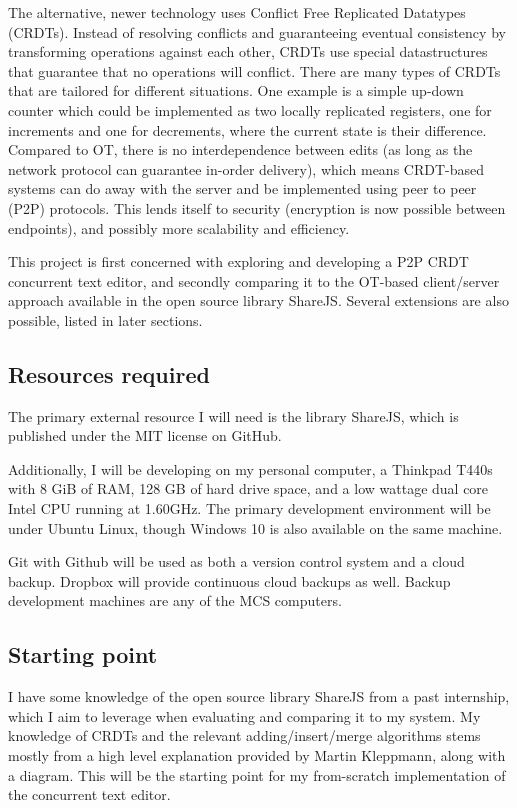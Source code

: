 \documentclass[12pt,a4paper,twoside]{article}
\begin{document}
The alternative, newer technology uses Conflict Free Replicated Datatypes (CRDTs). Instead of resolving conflicts and guaranteeing
eventual consistency by transforming operations against each other, CRDTs use special datastructures that guarantee
that no operations will conflict. There are many types of CRDTs that are tailored for different situations. One example
is a simple up-down counter which could be implemented as two locally replicated registers, one for increments and one
for decrements, where the current state is their difference. Compared to OT, there is no interdependence between edits (as long
as the network protocol can guarantee in-order delivery), which means CRDT-based systems can do away with the server
and be implemented using peer to peer (P2P) protocols. This lends itself to security (encryption is now possible between endpoints),
and possibly more scalability and efficiency.

This project is first concerned with exploring and developing a P2P CRDT concurrent text editor, and secondly comparing it to
the OT-based client/server approach available in the open source library ShareJS. Several extensions are also possible,
listed in later sections.

\subsection*{Resources required}

The primary external resource I will need is the library ShareJS, which is published under the MIT license on GitHub.

Additionally, I will be developing on my personal computer, a Thinkpad T440s with 8 GiB of RAM,
128 GB of hard drive space, and a low wattage dual core Intel CPU running at 1.60GHz.
The primary development environment will be under Ubuntu Linux, though Windows 10 is also available 
on the same machine. 

Git with Github will be used as both a version control system and a cloud backup. Dropbox will 
provide continuous cloud backups as well. Backup development machines are any of the MCS computers.

\subsection*{Starting point}

I have some knowledge of the open source library ShareJS from a past internship, which I aim to leverage when 
evaluating and comparing it to my system. My knowledge of CRDTs and the relevant adding/insert/merge
algorithms stems mostly from a high level explanation provided by Martin Kleppmann, along with a diagram.
This will be the starting point for my from-scratch implementation of the concurrent text editor.
\end{document}
